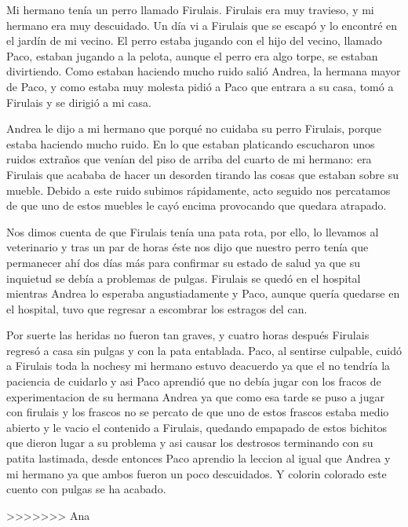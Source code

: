 \documentclass{article}
\begin{document}
Mi hermano tenía un perro llamado Firulais. Firulais era muy travieso, y mi hermano era muy descuidado. Un día vi a Firulais que se escapó y lo encontré en el jardín de mi vecino.
El perro estaba jugando con el hijo del vecino, llamado Paco, estaban jugando a la pelota, aunque el perro era algo torpe, se estaban divirtiendo. Como estaban haciendo mucho ruido salió Andrea, la hermana mayor de Paco, y como estaba muy molesta pidió a Paco que entrara a su casa, tomó a Firulais y se dirigió a mi casa.

Andrea le dijo a mi hermano que porqué no cuidaba su perro Firulais, porque estaba haciendo mucho ruido. En lo que estaban platicando escucharon unos ruidos extraños que venían del piso de arriba del cuarto de mi hermano: era Firulais que acababa de hacer un desorden tirando las cosas que estaban sobre su mueble. Debido a este ruido subimos rápidamente, acto seguido nos percatamos de que uno de estos muebles le cayó encima provocando que quedara atrapado.

Nos dimos cuenta de que Firulais tenía una pata rota, por ello, lo
llevamos al veterinario y tras un par de horas éste nos dijo que
nuestro perro tenía que permanecer ahí dos días más para confirmar su
estado de salud ya que su inquietud se debía a problemas de
pulgas. Firulais se quedó en el hospital mientras Andrea lo esperaba
angustiadamente y Paco, aunque quería quedarse en el hospital, tuvo
que regresar a escombrar los estragos del can. 

Por suerte las heridas no fueron tan graves, y cuatro horas después Firulais regresó a casa sin pulgas y con la pata
entablada. Paco, al sentirse culpable, cuidó a Firulais toda la nochesy mi hermano estuvo deacuerdo ya que el no tendría la paciencia de cuidarlo  
y asi Paco aprendió que no debía jugar con los fracos de experimentacion de su hermana Andrea ya que como esa tarde se puso a jugar con firulais y los frascos no se percato de que uno de estos frascos estaba medio abierto y le vacio el contenido a Firulais, quedando empapado de estos bichitos que dieron lugar a su problema y asi causar los destrosos terminando con su patita lastimada, desde entonces Paco aprendio la leccion al igual que Andrea y mi hermano ya que ambos fueron un poco descuidados. Y colorin colorado este cuento con pulgas se ha acabado.

 


>>>>>>> Ana
\end{document}
